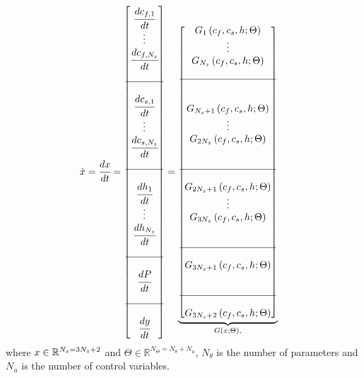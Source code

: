 \documentclass[a4paper,fleqn]{cas-dc}
\begin{document}
	{\footnotesize
		\begin{align*} \label{discretization}
			\dot{x} &= \cfrac{d x}{d t} = 
			\begin{bmatrix}
				\cfrac{d c_{f,1}}{d t} 	  \\
				\vdots					  \\
				\cfrac{d c_{f,N_z}}{d t} \\
				\\ \hline \\
				\cfrac{d c_{s,1}}{d t} 	  \\
				\vdots					  \\
				\cfrac{d c_{s,N_z}}{d t} \\
				\\ \hline \\
				\cfrac{d h_1}{d t} 	  \\
				\vdots 					  \\
				\cfrac{d h_{N_z}}{d t} \\
				\\ \hline \\
				\cfrac{d P}{d t} \\
				\\ \hline \\
				\cfrac{d y}{d t}
			\end{bmatrix}
			=
			\underbrace{\begin{bmatrix}
					G_1 \left( c_f,c_s,h; \Theta \right)\\ 
					\vdots\\ 
					G_{N_z} \left( c_f,c_s,h; \Theta \right)\\ 
					\\ \hline \\ \\
					G_{N_z+1} \left( c_f,c_s,h; \Theta \right)\\ 
					\vdots\\
					G_{2N_z} \left( c_f,c_s,h; \Theta \right)\\ 
					\\ \\ \hline \\ 
					G_{2N_z+1} \left( c_f,c_s,h; \Theta \right) \\
					\vdots\\
					G_{3N_z} \left( c_f,c_s,h; \Theta \right) \\ 
					\\ \\ \hline \\
					G_{3N_z+1} \left( c_f,c_s,h; \Theta \right) \\
					\\ \\ \hline \\
					G_{3N_z+2} \left( c_f,c_s,h; \Theta \right) 
			\end{bmatrix}}_{G \left( x; \Theta \right),} 
	\end{align*} }
	where ${\color{black}x} \in \mathbb{R}^{N_x = 3N_z+2} $ and $\Theta \in \mathbb{R}^{N_\Theta =  N_{\theta} + N_u } $, $N_{\theta}$ is the number of parameters and $N_{u}$ is the number of control variables.
	
\end{document}
